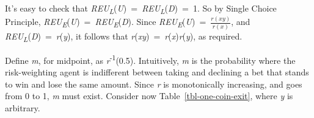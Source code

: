 \documentclass[
  12pt,
  letterpaper,
  DIV=11,
  numbers=noendperiod]{scrreprt}
\begin{document}
\begin{table}

\caption{\label{tbl-zero-coin-exit}An exit game with exit payout 0.}

\begin{minipage}[t]{0.50\linewidth}



\end{minipage}%
%
\begin{minipage}[t]{0.50\linewidth}



\end{minipage}%

\end{table}%

It's easy to check that
\emph{REU\textsubscript{L}}(\emph{U})~=~\emph{REU\textsubscript{L}}(\emph{D})~=~1.
So by Single Choice Principle,
\emph{REU\textsubscript{E}}(\emph{U})~=~\emph{REU\textsubscript{E}}(\emph{D}).
Since \emph{REU\textsubscript{E}}(\emph{U})~=~\(\frac{r(xy)}{r(x)}\),
and \emph{REU\textsubscript{L}}(\emph{D})~=~\emph{r}(\emph{y}), it
follows that \emph{r}(\emph{xy})~=~\emph{r}(\emph{x})\emph{r}(\emph{y}),
as required.

Define \emph{m}, for midpoint, as \emph{r}\textsuperscript{-1}(0.5).
Intuitively, \emph{m} is the probability where the risk-weighting agent
is indifferent between taking and declining a bet that stands to win and
lose the same amount. Since \emph{r} is monotonically increasing, and
goes from 0 to 1, \emph{m} must exist. Consider now
Table~\ref{tbl-one-coin-exit}, where \emph{y} is arbitrary.
\end{document}
